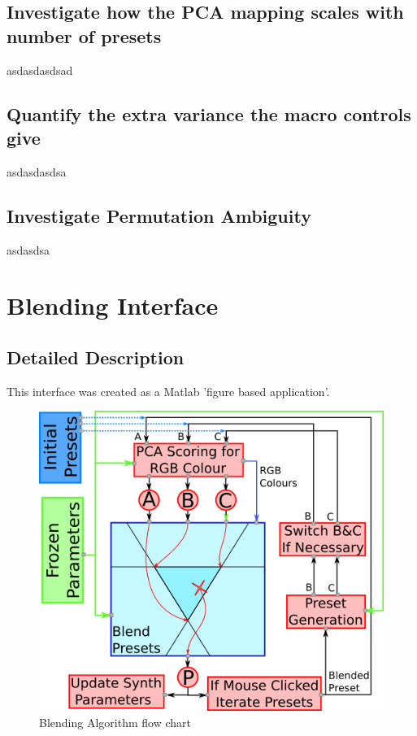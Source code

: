 \documentclass[11pt, oneside]{report}   	%
\begin{document}
\subsection{Investigate how the PCA mapping scales with number of presets}
asdasdasdsad
\subsection{Quantify the extra variance the macro controls give}
asdasdasdsa
\subsection{Investigate Permutation Ambiguity}
asdasdsa

\section{Blending Interface}
\subsection{Detailed Description}
This interface was created as a Matlab 'figure based application'.

\begin{figure}[h] 
	\centering
	\includegraphics[width = \textwidth]{BlendingAlgorithm.png}
	\caption{Blending Algorithm flow chart}
	\label{fig:BlendingAlgorithm}
\end{figure}
\end{document}
